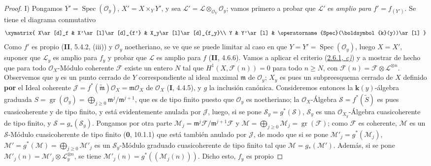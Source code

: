 \documentclass[10pt,oneside,openany]{book}
\theoremstyle{egaenv}\newtheorem*{env}{---}
\theoremstyle{egastatement}
\theoremstyle{egadescription}
\renewcommand{\geq}{\geqslant}
\begin{document}
\begin{proof}
\noindent I) Pongamos
$Y'=\operatorname{Spec}(\mathcal O_y)$, $X'=X\times_YY'$, y sea
$\mathcal L'=\mathcal L\otimes_{\mathcal O_Y}\mathcal O_y$;
vamos primero a probar que $\mathcal L'$ es \emph{amplio para}
$f'=f_{(Y')}$. Se tiene el diagrama conmutativo
\[
\xymatrix{
X\ar[d]_f & X'\ar[l]\ar[d]_{f'} & X_y\ar[l]\ar[d]_{f_y}\\
Y & Y'\ar[l] & \operatorname{Spec}(\boldsymbol{k}(y))\ar[l]
}
\]
Como $f'$ es propio (\textbf{II}, 5.4.2, (iii)) y $\mathcal O_y$ noetheriano, se
ve que se puede limitar al caso en que
$Y=Y'=\operatorname{Spec}(\mathcal O_y)$, luego $X=X'$, suponer que
$\mathcal L_y$ es amplio para $f_y$ y probar que $\mathcal L$ es amplio
para $f$ (\textbf{II}, 4.6.6). Vamos a aplicar el criterio
(\hyperref[III.2.6.1-fr]{2.6.1, \emph{c)}}) y a mostrar de hecho que para todo
$\mathcal O_X$-Módulo coherente $\mathcal F$ existe un entero $N$ tal que
$H^1(X,\mathcal F(n))=0$ para todo $n\geq N$, con
$\mathcal F(n)=\mathcal F\otimes\mathcal L^{\otimes n}$.
Observemos que $y$ es un punto cerrado de $Y$ correspondiente al ideal maximal
$\mathfrak m$ de $\mathcal O_y$; $X_y$ es pues un subpreesquema cerrado de
$X$ definido \textbf{por} el Ideal coherente
$\mathcal J=f^*(\widetilde{\mathfrak m})\mathcal O_X=
\mathfrak m\mathcal O_X$ de $\mathcal O_X$ (\textbf{I}, 4.4.5), y $g$ la inclusión
canónica. Consideremos entonces la $\boldsymbol{k}(y)$-álgebra graduada
$S=\operatorname{gr}(\mathcal O_y)
=\bigoplus_{j\geq0}\mathfrak m^j/\mathfrak m^{j+1}$,
que es de tipo finito puesto que $\mathcal O_y$ es noetheriano; la
$\mathcal O_X$-Álgebra $\mathcal S=f^*(\widetilde S)$ es pues
cuasicoherente y de tipo finito, y está evidentemente anulada por
$\mathcal J$, luego, si se pone $\mathcal S_y=g^*(\mathcal S)$,
$\mathcal S_y$ es una $\mathcal O_{X_y}$-Álgebra cuasicoherente de tipo
finito, y $\mathcal S=g_*(\mathcal S_y)$. Pongamos por otra parte
$\mathcal M_j=\mathfrak m^j\mathcal F/\mathfrak m^{j+1}\mathcal F$ y
$\mathcal M=\bigoplus_{j\geq0}\mathcal M_j
=\operatorname{gr}(\mathcal F)$;
como $\mathcal F$ es coherente, $\mathcal M$ es un $\mathcal S$-Módulo
cuasicoherente de tipo finito (\textbf{0}, 10.1.1) que está también anulado por
$\mathcal J$, de modo que si se pone
$\mathcal M'_j=g^*(\mathcal M_j)$, $\mathcal M'=g^*(\mathcal M)=\bigoplus_{j\geq0}\mathcal M'_j$
es un $\mathcal S_y$-Módulo graduado cuasicoherente de tipo
finito tal que $\mathcal M=g_*(\mathcal M')$. Además, si se pone
$\mathcal M'_j(n)=\mathcal M'_j\otimes\mathcal L_y^{\otimes n}$, se tiene
$\mathcal M'_j(n)=g^*((\mathcal M_j(n)))$. Dicho esto, $f_y$ es propio

\end{proof}
\end{document}
